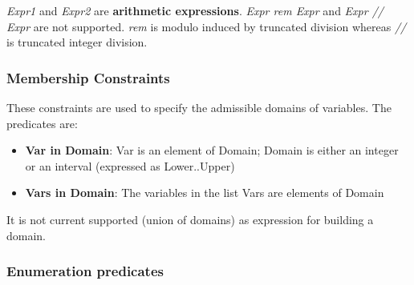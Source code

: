 \textit{Expr1} and \textit{Expr2} are \textbf{arithmetic expressions}.
\textit{Expr rem Expr} and \textit{Expr // Expr} are not supported. \textit{rem} is modulo induced by truncated division
whereas \textit{//} is truncated integer division.

\subsubsection{Membership Constraints}\label{subsubsec:Membership}

These constraints are used to specify the admissible domains of variables.\newline
The predicates are:\newline
\begin{itemize}
    \item \textbf{Var in Domain}: Var is an element of Domain; Domain is either an integer or an interval (expressed as Lower..Upper)
    \item \textbf{Vars in Domain}: The variables in the list Vars are elements of Domain
\end{itemize}

It is not current supported \textit{\/} (union of domains) as expression for building a domain.

\subsubsection{Enumeration predicates}\label{subsubsec:enumeration}

